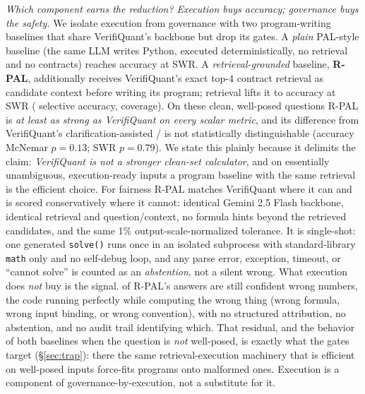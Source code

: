 \emph{Which component earns the reduction? Execution buys accuracy; governance buys the safety.}
We isolate execution from governance with two program-writing baselines that share VerifiQuant's backbone but drop its gates.
A \emph{plain} PAL-style baseline (the same LLM writes Python, executed deterministically, no retrieval and no contracts) reaches \palAccAll{} accuracy at \palSWRAll{} SWR.
A \emph{retrieval-grounded} baseline, \textbf{R-PAL}, additionally receives VerifiQuant's exact top-4 contract retrieval as candidate context before writing its program; retrieval lifts it to \rpalAccAll{} accuracy at \rpalSWRAll{} SWR (\rpalSelAccAll{} selective accuracy, \rpalCovAll{} coverage).
On these clean, well-posed questions R-PAL is \emph{at least as strong as VerifiQuant on every scalar metric}, and its difference from VerifiQuant's clarification-assisted \vqAccAll{}/\vqSWRAll{} is not statistically distinguishable (accuracy McNemar $p{=}0.13$; SWR $p{=}0.79$).
We state this plainly because it delimits the claim: \emph{VerifiQuant is not a stronger clean-set calculator}, and on essentially unambiguous, execution-ready inputs a program baseline with the same retrieval is the efficient choice.
For fairness R-PAL matches VerifiQuant where it can and is scored conservatively where it cannot: identical Gemini 2.5 Flash backbone, identical retrieval and question/context, no formula hints beyond the retrieved candidates, and the same 1\% output-scale-normalized tolerance.
It is single-shot: one generated \texttt{solve()} runs once in an isolated subprocess with standard-library \texttt{math} only and no self-debug loop, and any parse error, exception, timeout, or ``cannot solve'' is counted as an \emph{abstention}, not a silent wrong.
What execution does \emph{not} buy is the signal.
\rpalSWRAll{} of R-PAL's answers are still confident wrong numbers, the code running perfectly while computing the wrong thing (wrong formula, wrong input binding, or wrong convention), with no structured attribution, no abstention, and no audit trail identifying which.
That residual, and the behavior of both baselines when the question is \emph{not} well-posed, is exactly what the gates target (\S\ref{sec:trap}): there the same retrieval-execution machinery that is efficient on well-posed inputs force-fits programs onto malformed ones.
Execution is a component of governance-by-execution, not a substitute for it.

